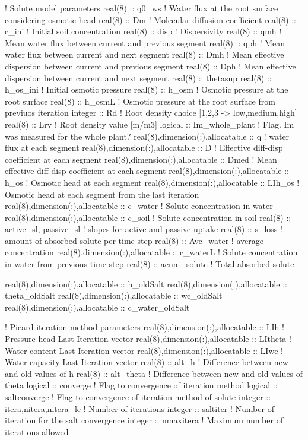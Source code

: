 ! Solute model parameters
real(8) :: q0_ws				! Water flux at the root surface considering osmotic head
real(8) :: Dm					! Molecular diffusion coefficient
real(8) :: c_ini				! Initial soil concentration
real(8) :: disp					! Dispersivity
real(8) :: qmh					! Mean water flux between current and previous segment
real(8) :: qph					! Mean water flux between current and next segment
real(8) :: Dmh					! Mean effective dispersion between current and previous segment
real(8) :: Dph                                  ! Mean effective dispersion between current and next segment
real(8) :: thetasup
real(8) :: h_os_ini				! Initial osmotic pressure
real(8) :: h_osm				! Osmotic pressure at the root surface
real(8) :: h_osmL				! Osmotic pressure at the root surface from previuos iteration
integer :: Rd					! Root density choice [1,2,3 -> low,medium,high]
real(8) :: Lrv					! Root density value [m/m3]
logical :: Im_whole_plant			! Flag. Im was measured for the whole plant?
real(8),dimension(:),allocatable :: q	  	! water flux at each segment
real(8),dimension(:),allocatable :: D	  	! Effective diff-disp coefficient at each segment
real(8),dimension(:),allocatable :: Dmed  	! Mean effective diff-disp coefficient at each segment
real(8),dimension(:),allocatable :: h_os	! Osmotic head at each segment
real(8),dimension(:),allocatable :: LIh_os	! Osmotic head at each segment from the last iteration
real(8),dimension(:),allocatable :: c_water	! Solute concentration in water
real(8),dimension(:),allocatable :: c_soil	! Solute concentration in soil
real(8) :: active_sl, passive_sl		! slopes for active and passive uptake
real(8) :: s_loss				! amount of absorbed solute per time step
real(8) :: Avc_water				! average concentration
real(8),dimension(:),allocatable :: c_waterL	! Solute concentration in water from previous time step
real(8) :: acum_solute				! Total absorbed solute

real(8),dimension(:),allocatable :: h_oldSalt
real(8),dimension(:),allocatable :: theta_oldSalt
real(8),dimension(:),allocatable :: wc_oldSalt
real(8),dimension(:),allocatable :: c_water_oldSalt

! Picard iteration method parameters
real(8),dimension(:),allocatable :: LIh		! Pressure head Last Iteration vector
real(8),dimension(:),allocatable :: LItheta	! Water content Last Iteration vector
real(8),dimension(:),allocatable :: LIwc	! Water capacity Last Iteration vector
real(8) :: alt_h				! Difference between new and old values of h
real(8) :: alt_theta				! Difference between new and old values of theta
logical :: converge				! Flag to convergence of iteration method
logical :: saltconverge				! Flag to convergence of iteration method of solute
integer :: itera,nitera,nitera_lc		! Number of iterations
integer :: saltiter				! Number of iteration for the salt convergence
integer :: nmaxitera				! Maximum number of iterations allowed

